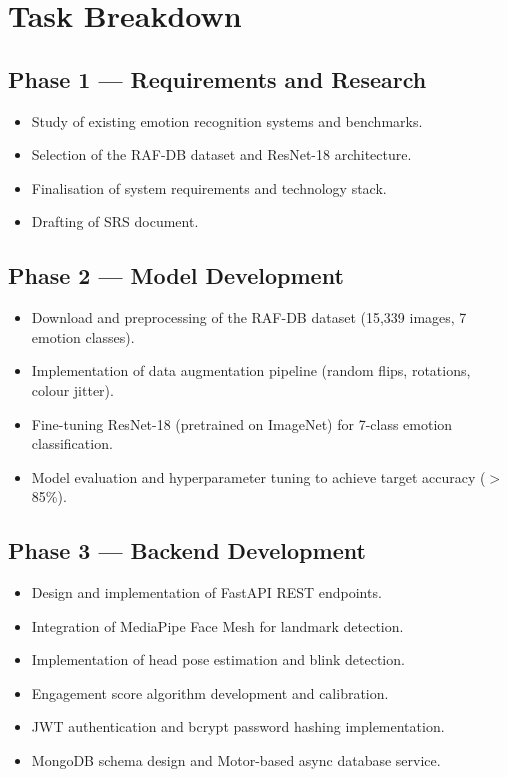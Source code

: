 \section{Task Breakdown}

\subsection{Phase 1 — Requirements and Research}
\begin{itemize}
    \item Study of existing emotion recognition systems and benchmarks.
    \item Selection of the RAF-DB dataset and ResNet-18 architecture.
    \item Finalisation of system requirements and technology stack.
    \item Drafting of SRS document.
\end{itemize}

\subsection{Phase 2 — Model Development}
\begin{itemize}
    \item Download and preprocessing of the RAF-DB dataset (15,339 images,
          7 emotion classes).
    \item Implementation of data augmentation pipeline (random flips,
          rotations, colour jitter).
    \item Fine-tuning ResNet-18 (pretrained on ImageNet) for 7-class
          emotion classification.
    \item Model evaluation and hyperparameter tuning to achieve target
          accuracy ($>$85\%).
\end{itemize}

\subsection{Phase 3 — Backend Development}
\begin{itemize}
    \item Design and implementation of FastAPI REST endpoints.
    \item Integration of MediaPipe Face Mesh for landmark detection.
    \item Implementation of head pose estimation and blink detection.
    \item Engagement score algorithm development and calibration.
    \item JWT authentication and bcrypt password hashing implementation.
    \item MongoDB schema design and Motor-based async database service.
\end{itemize}

